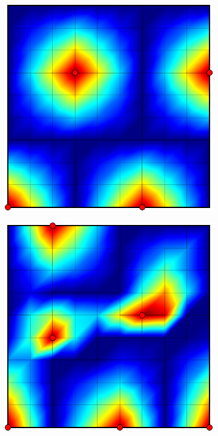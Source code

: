 \begin{figure}[htbp]
\begin{subfigure}[t]{0.3\textwidth}
  \end{subfigure}
  \par\bigskip
  \begin{subfigure}[t]{0.3\textwidth}
    \centerline{\includegraphics[width=0.9\linewidth]{figs/square_cart_struct_node_conv}}
  \end{subfigure}
  \hfill
  \begin{subfigure}[t]{0.3\textwidth}
    \centerline{\includegraphics[width=0.9\linewidth]{figs/square_cart_metis_node_conv}}

\end{subfigure}
\end{figure}
